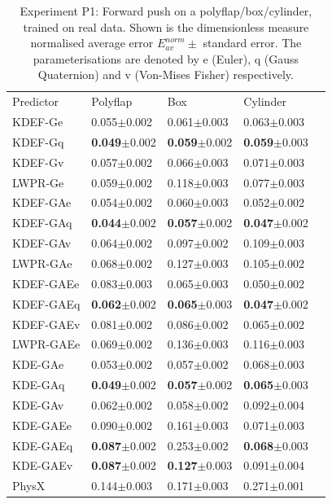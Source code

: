 \begin{table}[t]
\begin{center}

\label{tab:PerformanceTableL1av}
\begin{tabular}{|l|l|l|l|l|}
\cline{1-4}
Predictor & Polyflap & Box & Cylinder \\
\cline{1-4}
KDEF-Ge & 0.055$\pm$0.002 & 0.061$\pm$0.003 & 0.063$\pm$0.003\\
KDEF-Gq  & \textbf{0.049}$\pm$0.002 & \textbf{0.059}$\pm$0.002 & \textbf{0.059}$\pm$0.003\\
KDEF-Gv   & 0.057$\pm$0.002 & 0.066$\pm$0.003 & 0.071$\pm$0.003\\
LWPR-Ge &  0.059$\pm$0.002 & 0.118$\pm$0.003 & 0.077$\pm$0.003\\
\cline{1-4}
KDEF-GAe & 0.054$\pm$0.002 & 0.060$\pm$0.003 & 0.052$\pm$0.002\\
KDEF-GAq & \textbf{0.044}$\pm$0.002 & \textbf{0.057}$\pm$0.002 & \textbf{0.047}$\pm$0.002\\
KDEF-GAv  & 0.064$\pm$0.002 & 0.097$\pm$0.002  & 0.109$\pm$0.003 \\
LWPR-GAe & 0.068$\pm$0.002 & 0.127$\pm$0.003 & 0.105$\pm$0.002 \\
\cline{1-4}
KDEF-GAEe & 0.083$\pm$0.003 & 0.065$\pm$0.003 & 0.050$\pm$0.002 \\
KDEF-GAEq & \textbf{0.062}$\pm$0.002 & \textbf{0.065}$\pm$0.003 & \textbf{0.047}$\pm$0.002\\
KDEF-GAEv & 0.081$\pm$0.002 & 0.086$\pm$0.002 & 0.065$\pm$0.002\\
LWPR-GAEe & 0.069$\pm$0.002 & 0.136$\pm$0.003 & 0.116$\pm$0.003\\
\cline{1-4}
KDE-GAe & 0.053$\pm$0.002 & 0.057$\pm$0.002 & 0.068$\pm$0.003 \\
KDE-GAq  & \textbf{0.049}$\pm$0.002 & \textbf{0.057}$\pm$0.002 & \textbf{0.065}$\pm$0.003\\
KDE-GAv   & 0.062$\pm$0.002 & 0.058$\pm$0.002 & 0.092$\pm$0.004\\
\cline{1-4}
KDE-GAEe & 0.090$\pm$0.002 & 0.161$\pm$0.003 & 0.071$\pm$0.003\\
KDE-GAEq  & \textbf{0.087}$\pm$0.002 & 0.253$\pm$0.002 & \textbf{0.068}$\pm$0.003\\
KDE-GAEv   & \textbf{0.087}$\pm$0.002 & \textbf{0.127}$\pm$0.003 & 0.091$\pm$0.004\\
\cline{1-4}
PhysX & 0.144$\pm$0.003 &  0.171$\pm$0.003 & 0.271$\pm$0.001\\
\cline{1-4}
\end{tabular}
\caption[Performance Table]{Experiment P1: Forward push on a
  polyflap/box/cylinder, trained on real data. Shown is the dimensionless measure normalised average error  ${E_{av}^{norm}} \pm$ standard error. The parameterisations are denoted by e (Euler), q (Gauss Quaternion) and v (Von-Mises Fisher) respectively.
}
\end{center}
\end{table}

